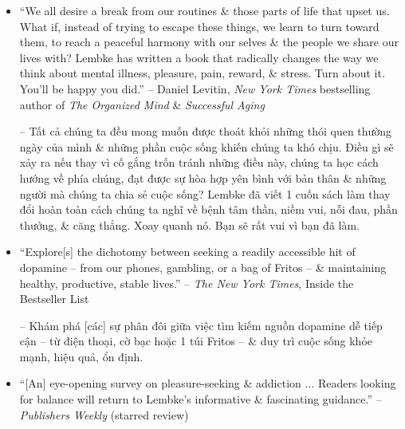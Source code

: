 \documentclass{article}
\begin{document}
\begin{enumerate}
\begin{itemize}
		-- Ngay khi bạn nghĩ rằng bạn đã biết tất cả những gì cần biết về cuộc khủng hoảng nghiện ngập thì Tiến sĩ {\sc Anna Lembke} xuất hiện với cuốn sách xuất sắc thứ 2 về chủ đề này -- cuốn sách này không phải về ma túy mà về loại hóa chất mạnh nhất: dopamine điều khiển các trung tâm đau đớn \& khoái cảm trong tâm trí chúng ta. Trong thời đại tiêu thụ quá mức \& sự hài lòng ngay lập tức, {\it Dopamine Nation} giải thích cái giá cá nhân \& xã hội của việc bị chi phối bởi giải pháp tiếp theo -- \& cách quản lý nó. Bất kể bạn có thấy mình quá đam mê điều gì - từ Internet, đồ ăn, công việc đến tình dục - bạn sẽ thấy cuốn sách này hấp dẫn, đáng sợ, có sức thuyết phục, \& được lập luận 1 cách khéo léo. Lembke dệt nên những câu chuyện của bệnh nhân bằng nghiên cứu, bằng 1 giọng nói vừa đồng cảm vừa trong sáng.
		\item ``We all desire a break from our routines \& those parts of life that upset us. What if, instead of trying to escape these things, we learn to turn toward them, to reach a peaceful harmony with our selves \& the people we share our lives with? Lembke has written a book that radically changes the way we think about mental illness, pleasure, pain, reward, \& stress. Turn about it. You'll be happy you did.'' -- {\sc Daniel Levitin}, {\it New York Times} bestselling author of {\it The Organized Mind} \& {\it Successful Aging}

		-- Tất cả chúng ta đều mong muốn được thoát khỏi những thói quen thường ngày của mình \& những phần cuộc sống khiến chúng ta khó chịu. Điều gì sẽ xảy ra nếu thay vì cố gắng trốn tránh những điều này, chúng ta học cách hướng về phía chúng, đạt được sự hòa hợp yên bình với bản thân \& những người mà chúng ta chia sẻ cuộc sống? Lembke đã viết 1 cuốn sách làm thay đổi hoàn toàn cách chúng ta nghĩ về bệnh tâm thần, niềm vui, nỗi đau, phần thưởng, \& căng thẳng. Xoay quanh nó. Bạn sẽ rất vui vì bạn đã làm.
		\item ``Explore[s] the dichotomy between seeking a readily accessible hit of dopamine -- from our phones, gambling, or a bag of Fritos -- \& maintaining healthy, productive, stable lives.'' -- {\it The New York Times}, Inside the Bestseller List

		-- Khám phá [các] sự phân đôi giữa việc tìm kiếm nguồn dopamine dễ tiếp cận -- từ điện thoại, cờ bạc hoặc 1 túi Fritos -- \& duy trì cuộc sống khỏe mạnh, hiệu quả, ổn định.
		\item ``[An] eye-opening survey on pleasure-seeking \& addiction $\ldots$ Readers looking for balance will return to Lembke's informative \& fascinating guidance.'' -- {\it Publishers Weekly} (starred review)


\end{itemize}
\end{enumerate}
\end{document}
